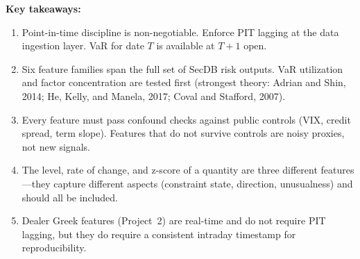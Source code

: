 \noindent\textbf{Key takeaways:}
\begin{enumerate}[nosep]
  \item Point-in-time discipline is non-negotiable.  Enforce PIT lagging
        at the data ingestion layer.  VaR for date $T$ is available at
        $T+1$ open.
  \item Six feature families span the full set of SecDB risk outputs.
        VaR utilization and factor concentration are tested first
        (strongest theory: Adrian and Shin, 2014; He, Kelly, and
        Manela, 2017; Coval and Stafford, 2007).
  \item Every feature must pass confound checks against public controls
        (VIX, credit spread, term slope).  Features that do not survive
        controls are noisy proxies, not new signals.
  \item The level, rate of change, and z-score of a quantity are three
        different features---they capture different aspects
        (constraint state, direction, unusualness) and should all be
        included.
  \item Dealer Greek features (Project~2) are real-time and do not
        require PIT lagging, but they do require a consistent intraday
        timestamp for reproducibility.
\end{enumerate}
